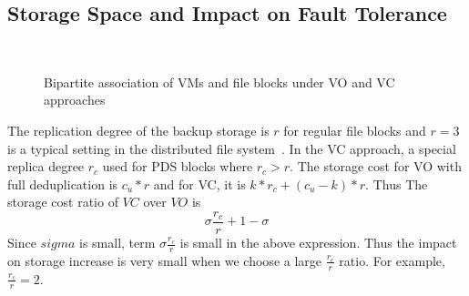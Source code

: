 \subsection{Storage Space and Impact on Fault Tolerance}
 
\begin{figure}
    \centering
    \\
    \caption{Bipartite association of VMs and file blocks under VO and VC approaches}
    \label{fig:share}
\end{figure}

The replication degree of the backup storage 
is $r$ for regular file blocks and $r=3$ is a typical setting in the distributed
file system~\cite{Hadoop,GFS}.
In the VC approach, a special replica degree $r_c$ used for PDS blocks where $r_c>r$. 
The storage cost for VO with full deduplication is $c_u *r$ and for VC, it is
$ k*r_c  + (c_u-k)*r$. Thus The storage cost ratio of $VC$ over $VO$ is 
\[
\sigma \frac{r_c}{r} + 1-\sigma
\]
Since $sigma$ is small,  term $\sigma \frac{r_c}{r}$ is small in the above expression.  
Thus the impact on storage increase is very small when we choose a large $\frac{r_c}{r}$ ratio. 
For example, $\frac{r_c}{r}=2$. 



